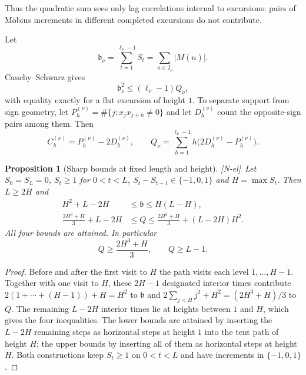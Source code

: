 \documentclass[11pt]{amsart}
\numberwithin{equation}{section}
\theoremstyle{plain}
\newtheorem{proposition}[theorem]{Proposition}
\theoremstyle{definition}
\theoremstyle{remark}
\newcommand{\tagNE}{\textup{[N-el]}}
\begin{document}
Thus the quadratic sum sees only lag correlations internal to excursions:
pairs of M\"obius increments in different completed excursions do not
contribute.

Let
\begin{equation}
\label{eq:beta_def}
\mathfrak b_\nu=\sum_{t=1}^{\ell_\nu-1}S_t=\sum_{n\in I_\nu}|M(n)|.
\end{equation}
Cauchy--Schwarz gives
\begin{equation}
\label{eq:beta-Q}
\mathfrak b_\nu^2\le(\ell_\nu-1)Q_\nu,
\end{equation}
with equality exactly for a flat excursion of height $1$. To separate
support from sign geometry, let $P_h^{(\nu)}=\#\{j:x_jx_{j+h}\ne0\}$ and let
$D_h^{(\nu)}$ count the opposite-sign pairs among them. Then
\begin{equation}
\label{eq:C-P-D}
C_h^{(\nu)}=P_h^{(\nu)}-2D_h^{(\nu)},\qquad
Q_\nu=\sum_{h=1}^{\ell_\nu-1}h\bigl(2D_h^{(\nu)}-P_h^{(\nu)}\bigr).
\end{equation}

\begin{proposition}[Sharp bounds at fixed length and height]
\label{prop:sharp-LH}
\tagNE\ Let $S_0=S_L=0$, $S_t\ge1$ for $0<t<L$, $S_t-S_{t-1}\in\{-1,0,1\}$ and
$H=\max S_t$. Then $L\ge2H$ and
\begin{align}
H^2+L-2H&\le\mathfrak b\le H(L-H),\label{eq:beta-LH}\\
\frac{2H^3+H}{3}+L-2H&\le Q\le
\frac{2H^3+H}{3}+(L-2H)H^2.\label{eq:Q-LH}
\end{align}
All four bounds are attained. In particular
\begin{equation}
\label{eq:height_Q_min}
Q\ge\frac{2H^3+H}{3},\qquad Q\ge L-1.
\end{equation}
\end{proposition}

\begin{proof}
Before and after the first visit to $H$ the path visits each level
$1,\dots,H-1$. Together with one visit to $H$, these $2H-1$ designated
interior times contribute $2(1+\cdots+(H-1))+H=H^2$ to $\mathfrak b$ and
$2\sum_{j<H}j^2+H^2=(2H^3+H)/3$ to $Q$. The remaining $L-2H$ interior times
lie at heights between $1$ and $H$, which gives the four inequalities. The
lower bounds are attained by inserting the $L-2H$ remaining steps as
horizontal steps at height $1$ into the tent path of height $H$; the upper
bounds by inserting all of them as horizontal steps at height $H$. Both
constructions keep $S_t\ge1$ on $0<t<L$ and have increments in
$\{-1,0,1\}$.
\end{proof}
\end{document}

